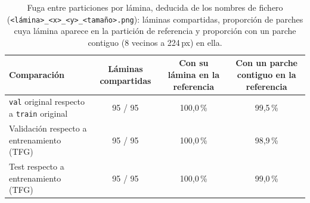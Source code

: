\begin{table}[tbp]
\centering
\scriptsize
\caption{Fuga entre particiones por lámina, deducida de los nombres de fichero (\texttt{<lámina>\_<x>\_<y>\_<tamaño>.png}): láminas compartidas, proporción de parches cuya lámina aparece en la partición de referencia y proporción con un parche contiguo (8 vecinos a 224\,px) en ella.}
\label{tab:fuga-contiguidad}
\begin{tabularx}{\textwidth}{>{\raggedright\arraybackslash}X ccc}
\toprule
Comparación & Láminas compartidas & Con su lámina en la referencia & Con un parche contiguo en la referencia \\
\midrule
\texttt{val} original respecto a \texttt{train} original & 95 / 95 & 100{,}0\,\% & 99{,}5\,\% \\
Validación respecto a entrenamiento (TFG) & 95 / 95 & 100{,}0\,\% & 98{,}9\,\% \\
Test respecto a entrenamiento (TFG) & 95 / 95 & 100{,}0\,\% & 99{,}0\,\% \\
\bottomrule
\end{tabularx}
\end{table}
